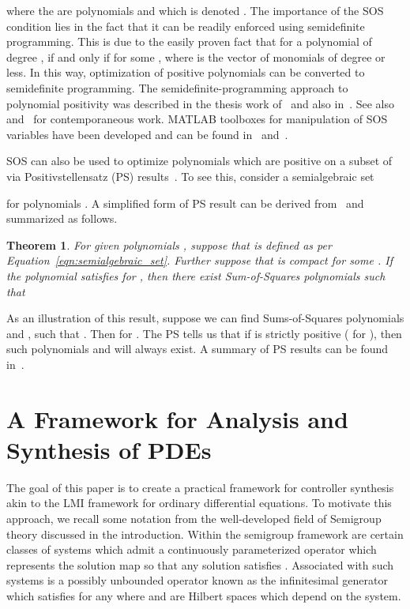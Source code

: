\documentclass[9pt,journal,twocolumn]{IEEEtran}
\newtheorem{theorem}{Theorem}
\begin{document}
where the  are polynomials and which is denoted . The importance of the SOS condition lies in the fact that it can be readily enforced using semidefinite programming. This is due to the easily proven fact that for a polynomial  of degree ,  if and only if  for some , where  is the vector of monomials of degree  or less. In this way, optimization of positive polynomials can be converted to semidefinite programming.
The semidefinite-programming approach to polynomial positivity was described in the thesis work of~\cite{parrilo2000structured} and also in~\cite{powers1998algorithm}. See also~\cite{chesi1999convexification} and~\cite{lasserre2001global} for contemporaneous work. MATLAB toolboxes for manipulation of SOS variables have been developed and can be found in~\cite{prajna2001introducing} and~\cite{henrion2003gloptipoly}.

SOS can also be used to optimize polynomials which are positive on a subset of  via Positivstellensatz (PS) results~\cite{stengle1974nullstellensatz,
schmudgen1991thek,putinar1993positive,jacobi2001representation}. To see this, consider a semialgebraic set

for polynomials . A simplified form of PS result can be derived from~\cite{putinar1993positive} and summarized as follows.
\begin{theorem}
For given polynomials , suppose that  is defined as per Equation~\eqref{eqn:semialgebraic_set}. Further suppose that  is compact for some . If the polynomial  satisfies  for , then there exist Sum-of-Squares polynomials  such that

\end{theorem}
As an illustration of this result, suppose we can find Sums-of-Squares polynomials  and , such that . Then  for . The PS tells us that if  is strictly positive ( for ), then such polynomials  and  will always exist. A summary of PS results can be found in~\cite{scheiderer2009positivity}.


\section{A Framework for Analysis and Synthesis of PDEs}


The goal of this paper is to create a practical framework for controller synthesis akin to the LMI framework for ordinary differential equations. To motivate this approach, we recall some notation from the well-developed field of Semigroup theory discussed in the introduction. Within the semigroup framework are certain classes of systems which admit a continuously parameterized operator  which represents the solution map so that any solution  satisfies . Associated with such systems is a possibly unbounded operator  known as the infinitesimal generator which satisfies  for any  where  and  are Hilbert spaces which depend on the system.
\end{document}
